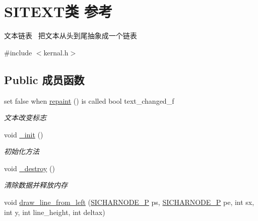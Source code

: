 \hypertarget{class_s_i_t_e_x_t}{}\section{S\+I\+T\+E\+X\+T类 参考}
\label{class_s_i_t_e_x_t}


文本链表~\newline
把文本从头到尾抽象成一个链表  




{\ttfamily \#include $<$kernal.\+h$>$}

\subsection*{Public 成员函数}
\begin{DoxyCompactItemize}
\item 
\mbox{\label{class_s_i_t_e_x_t_a944194c2df3c4ba2c599de6fbe0f98c2}} 
set false when \hyperlink{class_s_i_t_e_x_t_a944194c2df3c4ba2c599de6fbe0f98c2}{repaint} () is called bool text\+\_\+changed\+\_\+f
\begin{DoxyCompactList}\small\item\em 文本改变标志 \end{DoxyCompactList}\item 
\mbox{\label{class_s_i_t_e_x_t_ac836679c6c9b6eda88e895459bca7221}} 
void \hyperlink{class_s_i_t_e_x_t_ac836679c6c9b6eda88e895459bca7221}{\+\_\+init} ()
\begin{DoxyCompactList}\small\item\em 初始化方法 \end{DoxyCompactList}\item 
\mbox{\label{class_s_i_t_e_x_t_a4e4cd8c25dddf7c4fb8429b8d64be379}} 
void \hyperlink{class_s_i_t_e_x_t_a4e4cd8c25dddf7c4fb8429b8d64be379}{\+\_\+destroy} ()
\begin{DoxyCompactList}\small\item\em 清除数据并释放内存 \end{DoxyCompactList}\item 
void \hyperlink{class_s_i_t_e_x_t_addfcd93d6bc6b0ca0fb65be499414f69}{draw\+\_\+line\+\_\+from\+\_\+left} (\hyperlink{class_s_i_c_h_a_r_n_o_d_e}{S\+I\+C\+H\+A\+R\+N\+O\+D\+E\+\_\+P} ps, \hyperlink{class_s_i_c_h_a_r_n_o_d_e}{S\+I\+C\+H\+A\+R\+N\+O\+D\+E\+\_\+P} pe, int sx, int y, int line\+\_\+height, int deltax)

\end{DoxyCompactItemize}
